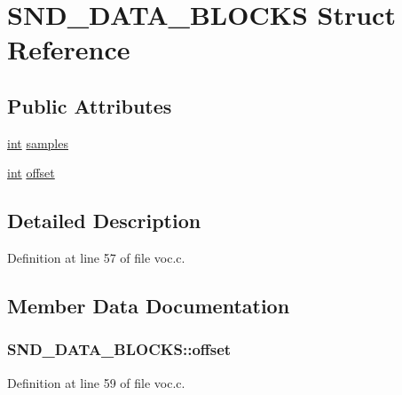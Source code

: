 \hypertarget{struct_s_n_d___d_a_t_a___b_l_o_c_k_s}{}\section{S\+N\+D\+\_\+\+D\+A\+T\+A\+\_\+\+B\+L\+O\+C\+KS Struct Reference}
\label{struct_s_n_d___d_a_t_a___b_l_o_c_k_s}
\subsection*{Public Attributes}
\begin{DoxyCompactItemize}
\item 
\hyperlink{xmltok_8h_a5a0d4a5641ce434f1d23533f2b2e6653}{int} \hyperlink{struct_s_n_d___d_a_t_a___b_l_o_c_k_s_adc72e552bb969b519d9052af33088700}{samples}
\item 
\hyperlink{xmltok_8h_a5a0d4a5641ce434f1d23533f2b2e6653}{int} \hyperlink{struct_s_n_d___d_a_t_a___b_l_o_c_k_s_a0f11dfcbad57ee7f13094fa212491bf9}{offset}
\end{DoxyCompactItemize}


\subsection{Detailed Description}


Definition at line 57 of file voc.\+c.



\subsection{Member Data Documentation}
\subsubsection[{\texorpdfstring{offset}{offset}}]{ S\+N\+D\+\_\+\+D\+A\+T\+A\+\_\+\+B\+L\+O\+C\+K\+S\+::offset}\hypertarget{struct_s_n_d___d_a_t_a___b_l_o_c_k_s_a0f11dfcbad57ee7f13094fa212491bf9}{}\label{struct_s_n_d___d_a_t_a___b_l_o_c_k_s_a0f11dfcbad57ee7f13094fa212491bf9}


Definition at line 59 of file voc.\+c.

